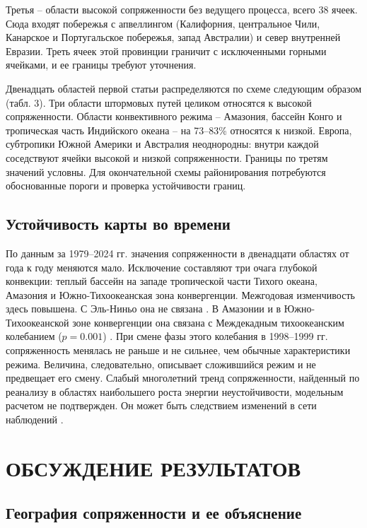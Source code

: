 \documentclass[12pt,a4paper]{article}
\begin{document}
Третья -- области высокой сопряженности без ведущего процесса, всего 38 ячеек. Сюда входят побережья с апвеллингом (Калифорния, центральное Чили, Канарское и Португальское побережья, запад Австралии) и север внутренней Евразии. Треть ячеек этой провинции граничит с исключенными горными ячейками, и ее границы требуют уточнения.

Двенадцать областей первой статьи распределяются по схеме следующим образом (табл. 3). Три области штормовых путей целиком относятся к высокой сопряженности. Области конвективного режима -- Амазония, бассейн Конго и тропическая часть Индийского океана -- на 73--83\% относятся к низкой. Европа, субтропики Южной Америки и Австралия неоднородны: внутри каждой соседствуют ячейки высокой и низкой сопряженности. Границы по третям значений условны. Для окончательной схемы районирования потребуются обоснованные пороги и проверка устойчивости границ.

\subsection{Устойчивость карты во времени}

По данным за 1979--2024 гг. значения сопряженности в двенадцати областях от года к году меняются мало. Исключение составляют три очага глубокой конвекции: теплый бассейн на западе тропической части Тихого океана, Амазония и Южно-Тихоокеанская зона конвергенции. Межгодовая изменчивость здесь повышена. С Эль-Ниньо она не связана \cite{Trenberth1997}. В Амазонии и в Южно-Тихоокеанской зоне конвергенции она связана с Междекадным тихоокеанским колебанием ($p = 0.001$) \cite{Power1999,Henley2015,Newman2016}. При смене фазы этого колебания в 1998--1999 гг. сопряженность менялась не раньше и не сильнее, чем обычные характеристики режима. Величина, следовательно, описывает сложившийся режим и не предвещает его смену. Слабый многолетний тренд сопряженности, найденный по реанализу в областях наибольшего роста энергии неустойчивости, модельным расчетом не подтвержден. Он может быть следствием изменений в сети наблюдений \cite{Bengtsson2004}.

\section{ОБСУЖДЕНИЕ РЕЗУЛЬТАТОВ}

\subsection{География сопряженности и ее объяснение}
\end{document}
